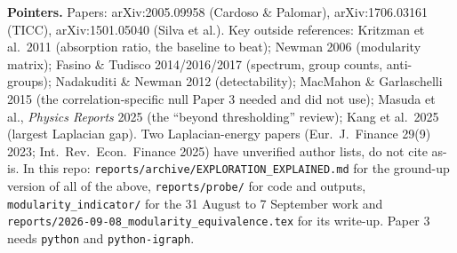 \documentclass[11pt,a4paper]{article}
\begin{document}
\vspace{4mm}
{\footnotesize
\textbf{Pointers.} Papers: arXiv:2005.09958 (Cardoso \& Palomar),
arXiv:1706.03161 (TICC), arXiv:1501.05040 (Silva et al.). Key outside
references: Kritzman et al.\ 2011 (absorption ratio, the baseline to beat);
Newman 2006 (modularity matrix); Fasino \& Tudisco 2014/2016/2017 (spectrum,
group counts, anti-groups); Nadakuditi \& Newman 2012 (detectability); MacMahon
\& Garlaschelli 2015 (the correlation-specific null Paper 3 needed and did not
use); Masuda et al., \emph{Physics Reports} 2025 (the ``beyond thresholding''
review); Kang et al.\ 2025 (largest Laplacian gap).
\textcolor{BadRed}{Two Laplacian-energy papers (Eur.\ J.\ Finance 29(9) 2023;
Int.\ Rev.\ Econ.\ Finance 2025) have unverified author lists, do not cite
as-is.}
In this repo: \texttt{reports/archive/EXPLORATION\_EXPLAINED.md} for the ground-up
version of all of the above, \texttt{reports/probe/} for code and outputs,
\texttt{modularity\_indicator/} for the 31 August to 7 September work and
\texttt{reports/2026-09-08\_modularity\_equivalence.tex} for its write-up.
Paper 3 needs \texttt{python} and \texttt{python-igraph}.
\par}
\end{document}
